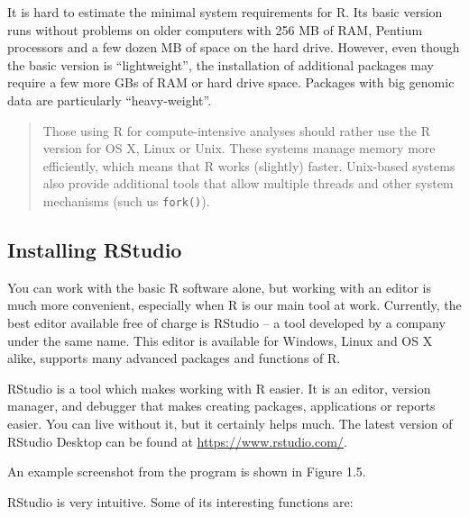 \documentclass[]{book}
\theoremstyle{definition}
\theoremstyle{definition}
\theoremstyle{definition}
\theoremstyle{remark}
\begin{document}
It is hard to estimate the minimal system requirements for R. Its basic
version runs without problems on older computers with 256 MB of RAM,
Pentium processors and a few dozen MB of space on the hard drive.
However, even though the basic version is ``lightweight'', the
installation of additional packages may require a few more GBs of RAM or
hard drive space. Packages with big genomic data are particularly
``heavy-weight''.

\begin{quote}
Those using R for compute-intensive analyses should rather use the R
version for OS X, Linux or Unix. These systems manage memory more
efficiently, which means that R works (slightly) faster. Unix-based
systems also provide additional tools that allow multiple threads and
other system mechanisms (such us \texttt{fork()}).
\end{quote}

\subsection{Installing RStudio}\label{part_132}

You can work with the basic R software alone, but working with an editor
is much more convenient, especially when R is our main tool at work.
Currently, the best editor available free of charge is RStudio -- a tool
developed by a company under the same name. This editor is available for
Windows, Linux and OS X alike, supports many advanced packages and
functions of R.

RStudio is a tool which makes working with R easier. It is an editor,
version manager, and debugger that makes creating packages, applications
or reports easier. You can live without it, but it certainly helps much.
The latest version of RStudio Desktop can be found at
\url{https://www.rstudio.com/}.

An example screenshot from the program is shown in Figure 1.5.

RStudio is very intuitive. Some of its interesting functions are:
\end{document}
